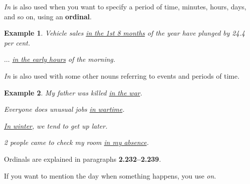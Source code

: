 \documentclass[oneside]{book}
\numberwithin{equation}{section}
\newtheorem{example}{Example}[section]
\begin{document}
%
\noindent{} \textit{In} is also used when you want to specify a period of time, minutes, hours, days, and so on, using an \textbf{ordinal}.
\begin{example}
    Vehicle sales \underline{in the 1st 8 months} of the year have plunged by 24.4 per cent.
    
    $\ldots$ \underline{in the early hours} of the morning.
\end{example}
\textit{In} is also used with some other nouns referring to events and periods of time.
\begin{example}
    My father was killed \underline{in the war}.
    
    Everyone does unusual jobs \underline{in wartime}.
    
    \underline{In winter}, we tend to get up later.
    
    2 people came to check my room \underline{in my absence}.
\end{example}
Ordinals are explained in paragraphs \textbf{2.232--2.239}.

%
\noindent{} If you want to mention the day when something happens, you use \textit{on}.
\end{document}
